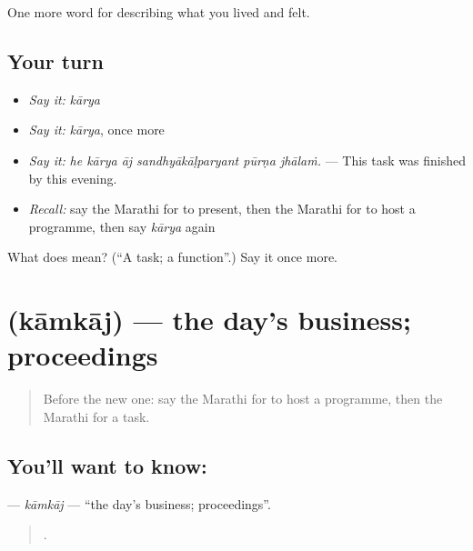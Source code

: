 \begin{grammarlens}[title={What you've built}]
One more word for describing what you lived and felt.
\end{grammarlens}

\subsection*{Your turn}
\begin{itemize}
\raggedright
  \item \emph{Say it:} \emph{kārya}
  \item \emph{Say it:} \emph{kārya}, once more
  \item \emph{Say it:} \emph{he kārya āj sandhyākāḷparyant pūrṇa jhālaṁ.} — This task was finished by this evening.
  \item \emph{Recall:} say the Marathi for to present, then the Marathi for to host a programme, then say \emph{kārya} again
\end{itemize}

\begin{tcolorbox}[breakable,colback=teal!4,colframe=teal!35!black,title={Before you move on}]
What does  mean? (\textquotedblleft{}A task; a function\textquotedblright{}.) Say it once more.
\end{tcolorbox}
\section[\texorpdfstring{\mr{कामकाज} (kāmkāj)}{कामकाज (kāmkāj)}]{ (kāmkāj) — the day's business; proceedings}

\label{lesson:MR-C514-kamkaj}



\begin{quote}
Before the new one: say the Marathi for to host a programme, then the Marathi for a task.
\end{quote}

\subsection*{You'll want to know: }
\textbf{} — \emph{kāmkāj} — \textquotedblleft{}the day's business; proceedings\textquotedblright{}.

\begin{quote}
    .
\end{quote}


